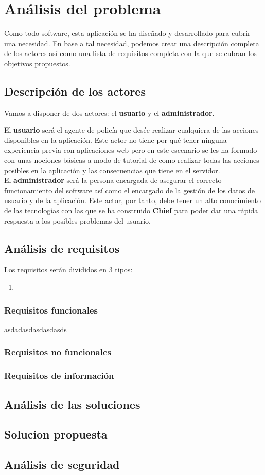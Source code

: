\chapter{Análisis del problema}
 
 Como todo software, esta aplicación se ha diseñado y desarrollado para cubrir una
 necesidad. En base a tal necesidad, podemos crear una descripción completa de los 
 actores así como una lista de requisitos completa con la que se cubran los objetivos 
 propuestos.

\section{Descripción de los actores}
Vamos a disponer de dos actores: el \textbf{usuario} y el \textbf{administrador}. 

El \textbf{usuario} será el agente de policía que desée realizar cualquiera de las acciones
disponibles en la aplicación. Este actor no tiene por qué tener ninguna experiencia previa
con aplicaciones web pero en este escenario se les ha formado con unas nociones básicas 
a modo de tutorial de como realizar todas las acciones posibles en la aplicación y las consecuencias
que tiene en el servidor.\\

El \textbf{administrador} será la persona encargada de asegurar el correcto funcionamiento 
del software así como el encargado de la gestión de los datos de usuario y de la aplicación. Este
actor, por tanto, debe tener un alto conocimiento de las tecnologías con las que se ha construido
\textbf{Chief} para poder dar una rápida respuesta a los posibles problemas del usuario.

\section{Análisis de requisitos}

Los requisitos serán divididos en 3 tipos:

\begin{enumerate}
   \item \textbf{}
\end{enumerate}


\subsection{Requisitos funcionales}

asdadasdasdasdasds
\subsection{Requisitos no funcionales}
\subsection{Requisitos de información}


\section{Análisis de las soluciones}

\section{Solucion propuesta}

\section{Análisis de seguridad}
